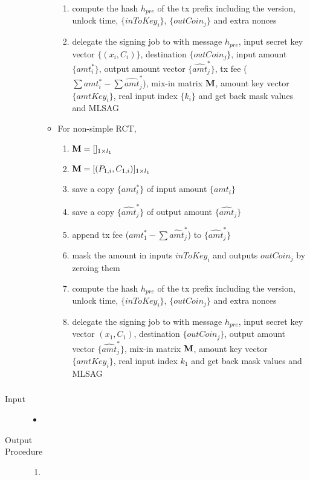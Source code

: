 \begin{description}
\begin{enumerate}
\begin{itemize}
\begin{enumerate}
								\item compute the hash \(h_{pre}\) of the tx prefix including the version, unlock time, \(\{inToKey_i\}\), \(\{outCoin_j\}\) and extra nonces
								\item  delegate the signing job to  with message \(h_{pre}\), input secret key vector \(\{(x_i,C_i)\}\), destination \(\{outCoin_j\}\), input amount \(\{amt_i^*\}\), output amount vector \(\{\hat{amt}_j^*\}\), tx fee (\(\sum amt_i^*-\sum \hat{amt}_j^*\)), mix-in matrix \(\mathbf{M}\), amount key vector \(\{amtKey_i\}\), real input index \(\{k_i\}\) and get back mask values and MLSAG
							\end{enumerate}
						\item For non-simple RCT,
							\begin{enumerate}
								\item \(\mathbf{M}=[]_{1\times l_1}\)
								\item \(\mathbf{M}=[(P_{1,i},C_{1,i})]_{1\times l_1}\)
								\item save a copy \(\{amt_i^*\}\) of input amount \(\{amt_i\}\)
								\item save a copy \(\{\hat{amt}_j^*\}\) of output amount \(\{\hat{amt}_j\}\)
								\item append tx fee (\(amt_1^*-\sum \hat{amt}_j^*\)) to \(\{\hat{amt}_j^*\}\)
								\item mask the amount in inputs \(inToKey_i\) and outputs \(outCoin_j\) by zeroing them
								\item compute the hash \(h_{pre}\) of the tx prefix including the version, unlock time, \(\{inToKey_i\}\), \(\{outCoin_j\}\) and extra nonces
								\item  delegate the signing job to  with message \(h_{pre}\), input secret key vector \((x_1,C_1)\), destination \(\{outCoin_j\}\), output amount vector \(\{\hat{amt}_j^*\}\), mix-in matrix \(\mathbf{M}\), amount key vector \(\{amtKey_i\}\), real input index \(k_1\) and get back mask values and MLSAG
							\end{enumerate}
					\end{itemize}
			\end{enumerate}
	\end{description}
\subsubsection{ } 
	\begin{description}
		\item[Input]
			\begin{itemize}
				\item 
			\end{itemize}
		\item[Output]
		\item[Procedure]
			\begin{enumerate}
				\item 
			\end{enumerate}
	\end{description}
